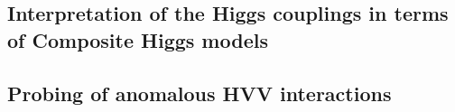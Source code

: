 \documentclass[../report.tex]{subfiles}
\providecommand{\main}{..}
\begin{document}
\subsection{Interpretation of the Higgs couplings in terms of Composite Higgs models}


\subsection{Probing of anomalous HVV interactions}
\label{sec:2:anomalous_HVV}



\clearpage

\end{document}

